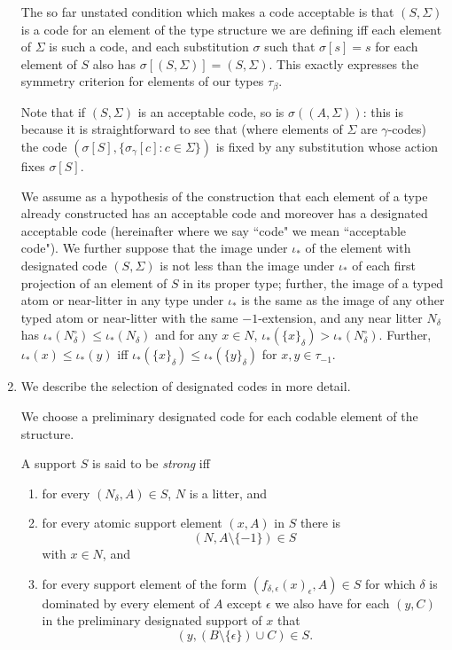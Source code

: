 \documentclass[12pt]{article}
\begin{document}
\begin{enumerate}
The so far unstated condition which makes a code acceptable is that $(S,\Sigma)$ is a code for an element of the type structure we are defining iff each element of $\Sigma$ is such a code, and each substitution $\sigma$ such that
$\sigma[s]=s$ for each element of $S$ also has $\sigma[(S,\Sigma)] = (S,\Sigma)$.  This exactly expresses the symmetry criterion for elements of our types $\tau_\beta$.

Note that if $(S,\Sigma)$ is an acceptable code, so is $\sigma((A,\Sigma))$:  this is because it is straightforward to see that (where elements of $\Sigma$ are $\gamma$-codes) the code $(\sigma[S],\{\sigma_\gamma[c]:c \in \Sigma\})$ is fixed by any substitution whose action  fixes $\sigma[S]$.

We assume as a hypothesis of the construction that each element of a type already constructed has an acceptable code and moreover has a designated acceptable code (hereinafter where we say ``code" we mean ``acceptable code").  We further suppose that the image under $\iota_*$ of the element with designated code $(S,\Sigma)$
is not less than the image under $\iota_*$  of each first projection of an element of $S$ in its proper type;  further, the image of a typed atom or near-litter in any type under $\iota_*$ is the same as the image of any other typed atom or near-litter with the same $-1$-extension, and any
near litter $N_\delta$ has $\iota_*(N^{\circ}_\delta) \leq \iota_*(N_\delta)$ and for any $x \in N$, $\iota_*(\{x\}_\delta) > \iota_*(N^\circ_\delta)$.  Further, $\iota_*(x) \leq \iota_*(y)$ iff $\iota_*(\{x\}_\delta) \leq \iota_*(\{y\}_\delta)$ for $x,y \in \tau_{-1}$.

\item We describe the selection of designated codes in more detail.

We choose a preliminary designated code for each codable element of the structure.

A support $S$ is said to be {\em strong\/} iff

\begin{enumerate}

\item for every $(N_\delta,A) \in S$, $N$ is a litter, and
\item  for every atomic support element $(x,A)$ in $S$ there is $$(N,A\setminus\{-1\}) \in S$$ with $x \in N$, and 

\item for every support element of the form $(f_{\delta,\epsilon}(x)_\epsilon,A) \in S$ for which $\delta$ is dominated by every element of $A$ except $\epsilon$ we also have for each $(y,C)$ in the preliminary designated support
of $x$ that $$(y,(B \setminus \{\epsilon\})\cup C)\in S.$$


\end{enumerate}
\end{enumerate}
\end{document}
